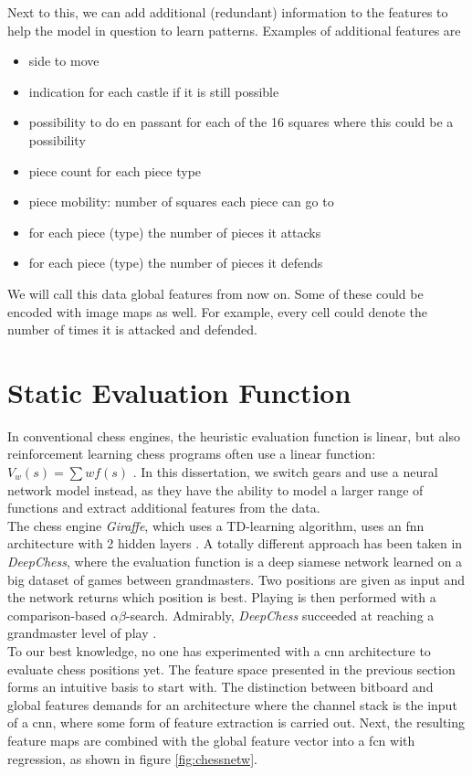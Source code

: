 \label{ex:feat}

Next to this, we can add additional (redundant) information to the features to help the model in question to learn patterns. Examples of additional features are
\begin{itemize}
\item side to move
\item indication for each castle if it is still possible
\item possibility to do en passant for each of the 16 squares where this could be a possibility
\item piece count for each piece type
\item piece mobility: number of squares each piece can go to
\item for each piece (type) the number of pieces it attacks
\item for each piece (type) the number of pieces it defends
\end{itemize}
We will call this data global features from now on. Some of these could be encoded with image maps as well. For example, every cell could denote the number of times it is attacked and defended.

\section{Static Evaluation Function}
\label{sec:sef}
In conventional chess engines, the heuristic evaluation function is linear, but also reinforcement learning chess programs often use a linear function: $V_w(s)=\sum w f(s)$ \cite{baxt99,veness09}. In this dissertation, we switch gears and use a neural network model instead, as they have the ability to model a larger range of functions and extract additional features from the data.\\
The chess engine \textit{Giraffe}, which uses a TD-learning algorithm, uses an \gls{fnn} architecture with 2 hidden layers \cite{giraffe15}. A totally different approach has been taken in \textit{DeepChess}, where the evaluation function is a deep siamese network learned on a big dataset of games between grandmasters. Two positions are given as input and the network returns which position is best. Playing is then performed with a comparison-based $\alpha\beta$-search. Admirably, \textit{DeepChess} succeeded at reaching a grandmaster level of play \cite{David2016}.\\

To our best knowledge, no one has experimented with a \gls{cnn} architecture to evaluate chess positions yet. The feature space presented in the previous section forms an intuitive basis to start with. The distinction between bitboard and global features demands for an architecture where the channel stack is the input of a \gls{cnn}, where some form of feature extraction is carried out. Next, the resulting feature maps are combined with the global feature vector into a \gls{fcn} with regression, as shown in figure \ref{fig:chessnetw}. 

